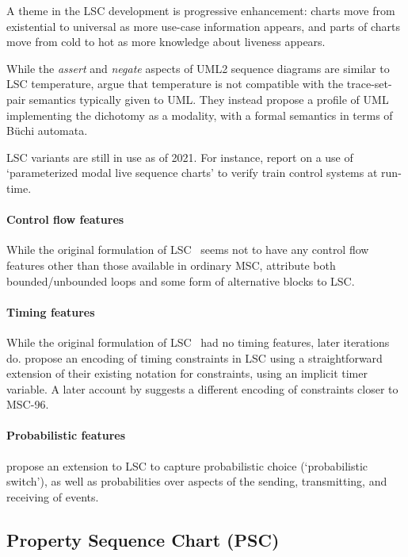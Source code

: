 A theme in the LSC development is progressive enhancement: charts move
from existential to universal as more use-case information appears,
and parts of charts move from cold to hot as more knowledge about
liveness appears.

While the \emph{assert} and \emph{negate} aspects of UML2 sequence diagrams
are similar to LSC temperature, \textcite{Harel08-ModalSD} argue
that temperature is not compatible with the trace-set-pair semantics typically
given to UML.  They instead propose a profile of UML implementing the
dichotomy as a modality, with a formal semantics in terms of B\"uchi automata.

LSC variants are still in use as of 2021.  For instance,
\textcite{Chai21-PMLSC} report on a use of `parameterized modal
live sequence charts' to verify train control systems at run-time.

\paragraph{Control flow features}

While the original formulation of LSC~\cite{lsc} seems not to have any
control flow features other than those available in ordinary MSC,
\textcite{Harel03-MSC} attribute both bounded/unbounded loops and some
form of alternative blocks to LSC.

\paragraph{Timing features}
While the original formulation of LSC~\cite{lsc} had no timing
features, later iterations do.
\textcite{Harel03-MSC} propose an encoding of timing constraints in
LSC using a straightforward extension of their existing notation for
constraints, using an implicit timer variable.  A later account by
\textcite{Brill04-LSCintro} suggests a different encoding of
constraints closer to MSC-96.

\paragraph{Probabilistic features}
\textcite{Kai14-PLSC} propose an extension to LSC to capture
probabilistic choice (`probabilistic switch'), as well as
probabilities over aspects of the sending, transmitting, and receiving
of events.

\subsection{Property Sequence Chart (PSC)}

